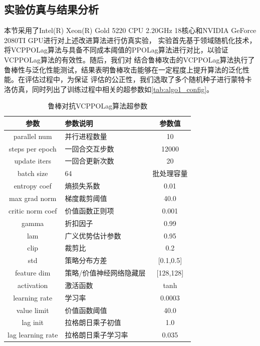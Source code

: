 \subsection{实验仿真与结果分析}
本节采用了Intel(R) Xeon(R) Gold 5220 CPU 2.20GHz 18核心和NVIDIA GeForce 2080TI GPU进行对上述改进算法进行仿真实验，
实验首先基于领域随机化技术，将VCPPOLag算法与具备不同成本阈值的PPOLag算法进行对比，以验证VCPPOLag算法的有效性。随后，我们对
结合鲁棒攻击的VCPPOLag算法执行了鲁棒性与泛化性能测试，结果表明鲁棒攻击能够在一定程度上提升算法的泛化性能。在评估过程中，为保证
评估的公正性，我们选取了多个随机种子进行蒙特卡洛仿真，同时列出了训练过程中相关的超参数如\autoref{tab:algo1_config}。
\begin{table}[htbp]
    \centering %
    \caption{\label{tab:algo1config}鲁棒对抗VCPPOLag算法超参数}
    \begin{tabularx}{0.7\linewidth}{|c|X|c|}
        \hline
        参数 & 参数说明 & 参数值 \\ \hline
        parallel num& 并行进程数量 & 10 \\ \hline
        steps per epoch & 一回合交互步数 & 12000 \\ \hline
        update iters & 一回合更新次数 & 20 \\ \hline
        batch size & 64 & 批处理容量\\ \hline
        entropy coef & 熵损失系数 & 0.01 \\ \hline
        max grad norm & 梯度裁剪阈值 & 40.0 \\ \hline
        critic norm coef & 价值函数正则项 & 0.001 \\ \hline
        gamma & 折扣因子 & 0.99 \\ \hline
        lam & 广义优势估计参数 & 0.95 \\ \hline
        clip & 裁剪比 & 0.2 \\ \hline
        std & 策略分布方差 & [0.1,0.5] \\ \hline
        feature dim & 策略/价值神经网络隐藏层 & [128,128] \\ \hline
        activation & 激活函数 & tanh \\ \hline
        learning rate & 学习率 & 0.0003 \\ \hline
        value limit & 价值函数阈值 & 40.0 \\ \hline
        lag init & 拉格朗日乘子初值 & 1.0 \\ \hline
        lag learning rate & 拉格朗日乘子学习率 & 0.035 \\ \hline
    \end{tabularx}
\end{table}

